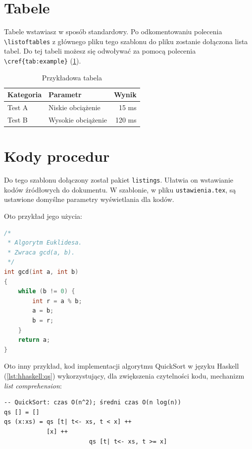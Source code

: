 \section{Tabele}

Tabele wstawiasz w sposób standardowy. 
Po odkomentowaniu polecenia  \verb|\listoftables| z głównego pliku tego szablonu do pliku zostanie dołączona lista tabel.
Do tej tabeli możesz się odwoływać za pomocą polecenia \verb|\cref{tab:example}| (\cref{tab:example}).
                                             
\begin{table}[htbp]
  \caption{Przykładowa tabela }
  \centering
  \begin{tabular}{|l|l|r|}
    \hline
    \textbf{Kategoria} & \textbf{Parametr} & \textbf{Wynik} \\
    \hline
    Test A & Niskie obciążenie & 15 ms \\
    Test B & Wysokie obciążenie & 120 ms \\
    \hline
  \end{tabular}
  \label{tab:example}
\end{table}

\section{Kody procedur}

Do tego szablonu dołączony został pakiet \texttt{listings}. 
Ułatwia on wstawianie kodów źródłowych do dokumentu. W szablonie, w pliku \texttt{ustawienia.tex},  
są ustawione domyślne parametry wyświetlania dla kodów. 

Oto przykład jego użycia:

\begin{lstlisting}[language=C, 
caption={Algorytm Euklidesa w języku C}, 
label={lst:hello}]
/* 
 * Algorytm Euklidesa.
 * Zwraca gcd(a, b).
 */
int gcd(int a, int b)
{
    while (b != 0) {
        int r = a % b;
        a = b;
        b = r;
    }
    return a;
}
\end{lstlisting}

Oto inny przykład, kod implementacji algorytmu QuickSort w języku Haskell (\cref{lst:hhaskell:qs}) wykorzystujący,
dla zwiększenia czytelności kodu,  mechanizm \textit{list comprehension}: \par

\begin{lstlisting}[style=haskellStyle, %language=haskell, 
caption={Algorytm QuickSort w języku Haskell}, 
label={lst:hhaskell:qs}]
-- QuickSort: czas O(n^2); średni czas O(n log(n))
qs [] = []
qs (x:xs) = qs [t| t<- xs, t < x] ++ 
            [x] ++ 
						qs [t| t<- xs, t >= x]
\end{lstlisting}


